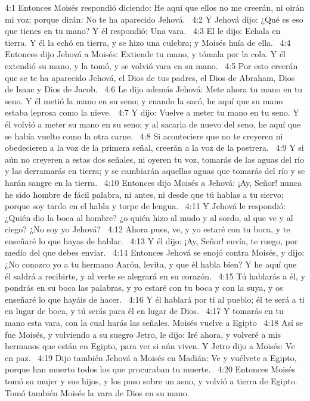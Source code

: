 4:1 Entonces Moisés respondió diciendo: He aquí que ellos no me creerán, ni oirán mi voz; porque dirán: No te ha aparecido Jehová.  
4:2 Y Jehová dijo: ¿Qué es eso que tienes en tu mano? Y él respondió: Una vara.  
4:3 El le dijo: Echala en tierra. Y él la echó en tierra, y se hizo una culebra; y Moisés huía de ella.  
4:4 Entonces dijo Jehová a Moisés: Extiende tu mano, y tómala por la cola. Y él extendió su mano, y la tomó, y se volvió vara en su mano.  
4:5 Por esto creerán que se te ha aparecido Jehová, el Dios de tus padres, el Dios de Abraham, Dios de Isaac y Dios de Jacob.  
4:6 Le dijo además Jehová: Mete ahora tu mano en tu seno. Y él metió la mano en su seno; y cuando la sacó, he aquí que su mano estaba leprosa como la nieve.  
4:7 Y dijo: Vuelve a meter tu mano en tu seno. Y él volvió a meter su mano en su seno; y al sacarla de nuevo del seno, he aquí que se había vuelto como la otra carne.  
4:8 Si aconteciere que no te creyeren ni obedecieren a la voz de la primera señal, creerán a la voz de la postrera.  
4:9 Y si aún no creyeren a estas dos señales, ni oyeren tu voz, tomarás de las aguas del río y las derramarás en tierra; y se cambiarán aquellas aguas que tomarás del río y se harán sangre en la tierra.  
4:10 Entonces dijo Moisés a Jehová: ¡Ay, Señor! nunca he sido hombre de fácil palabra, ni antes, ni desde que tú hablas a tu siervo; porque soy tardo en el habla y torpe de lengua.  
4:11 Y Jehová le respondió: ¿Quién dio la boca al hombre? ¿o quién hizo al mudo y al sordo, al que ve y al ciego? ¿No soy yo Jehová?  
4:12 Ahora pues, ve, y yo estaré con tu boca, y te enseñaré lo que hayas de hablar.  
4:13 Y él dijo: ¡Ay, Señor! envía, te ruego, por medio del que debes enviar.  
4:14 Entonces Jehová se enojó contra Moisés, y dijo: ¿No conozco yo a tu hermano Aarón, levita, y que él habla bien? Y he aquí que él saldrá a recibirte, y al verte se alegrará en su corazón.  
4:15 Tú hablarás a él, y pondrás en su boca las palabras, y yo estaré con tu boca y con la suya, y os enseñaré lo que hayáis de hacer.  
4:16 Y él hablará por ti al pueblo; él te será a ti en lugar de boca, y tú serás para él en lugar de Dios.  
4:17 Y tomarás en tu mano esta vara, con la cual harás las señales. 
Moisés vuelve a Egipto  
4:18 Así se fue Moisés, y volviendo a su suegro Jetro, le dijo: Iré ahora, y volveré a mis hermanos que están en Egipto, para ver si aún viven. Y Jetro dijo a Moisés: Ve en paz.  
4:19 Dijo también Jehová a Moisés en Madián: Ve y vuélvete a Egipto, porque han muerto todos los que procuraban tu muerte.  
4:20 Entonces Moisés tomó su mujer y sus hijos, y los puso sobre un asno, y volvió a tierra de Egipto. Tomó también Moisés la vara de Dios en su mano.  
